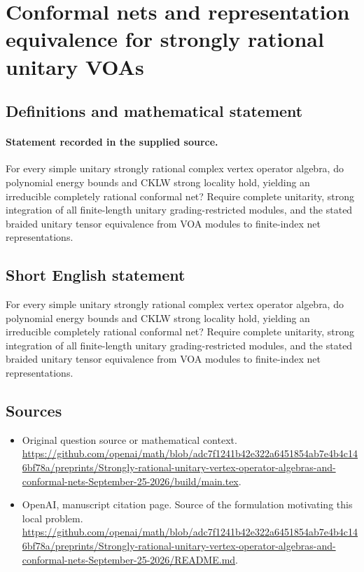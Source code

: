 \documentclass[11pt]{article}
\begin{document}
\section*{Conformal nets and representation equivalence for strongly rational unitary VOAs}\label{30007248}
\subsection{Definitions and mathematical statement}
\paragraph{Statement recorded in the supplied source.}
For every simple unitary strongly rational complex vertex operator algebra, do polynomial energy bounds and CKLW strong locality hold, yielding an irreducible completely rational conformal net? Require complete unitarity, strong integration of all finite-length unitary grading-restricted modules, and the stated braided unitary tensor equivalence from VOA modules to finite-index net representations.
\subsection{Short English statement}
For every simple unitary strongly rational complex vertex operator algebra, do polynomial energy bounds and CKLW strong locality hold, yielding an irreducible completely rational conformal net? Require complete unitarity, strong integration of all finite-length unitary grading-restricted modules, and the stated braided unitary tensor equivalence from VOA modules to finite-index net representations.
\subsection{Sources}
\begin{itemize}
\item[S1] Original question source or mathematical context.
\url{https://github.com/openai/math/blob/adc7f1241b42e322a6451854ab7e4b4c146bf78a/preprints/Strongly-rational-unitary-vertex-operator-algebras-and-conformal-nets-September-25-2026/build/main.tex}.
\item[S2] OpenAI, manuscript citation page. Source of the formulation motivating this local problem.
\url{https://github.com/openai/math/blob/adc7f1241b42e322a6451854ab7e4b4c146bf78a/preprints/Strongly-rational-unitary-vertex-operator-algebras-and-conformal-nets-September-25-2026/README.md}.
\end{itemize}
\end{document}

